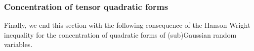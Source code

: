 \subsubsection{Concentration of tensor quadratic forms}

Finally, we end this section with the following consequence of the Hanson-Wright inequality for the concentration of quadratic forms of (sub)Gaussian random variables.
%
%
